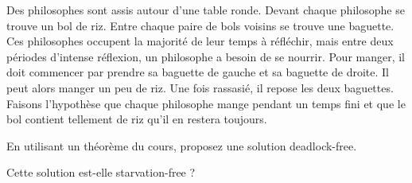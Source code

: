 
\begingroup

\begin{exercice}
  \label{exo:blocking/philosophers}

  Des philosophes sont assis autour d'une table ronde. Devant
  chaque philosophe se trouve un bol de riz. Entre chaque paire de bols voisins
  se trouve une baguette. Ces philosophes occupent la
  majorité de leur temps à réfléchir, mais entre deux périodes
  d'intense réflexion, un philosophe a besoin de se nourrir. Pour
  manger, il doit commencer par prendre sa baguette de gauche et sa
  baguette de droite. Il peut alors manger un peu de riz. Une fois rassasié,
  il repose les deux baguettes. Faisons l'hypothèse que chaque
  philosophe mange pendant un temps fini et que le bol contient
  tellement de riz qu'il en restera toujours.
  
  \begin{questions}
  \item En utilisant un théorème du cours, proposez une solution deadlock-free. 
  \item Cette solution est-elle starvation-free ?
  \end{questions}

\end{exercice}

\endgroup
\endinput
